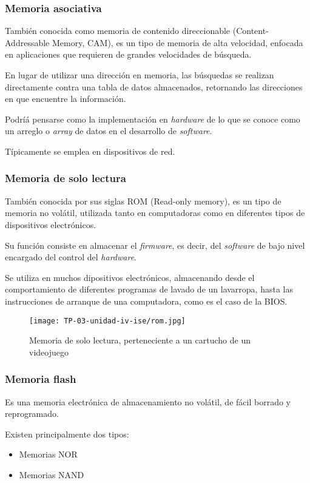 \documentclass[12pt]{article}
\begin{document}
\subsubsection{Memoria asociativa}

También conocida como memoria de contenido direccionable
(Content-Addressable Memory, CAM),
es un tipo de memoria de alta velocidad,
enfocada en aplicaciones que requieren de grandes velocidades de búsqueda.

En lugar de utilizar una dirección en memoria, las búsquedas
se realizan directamente contra una tabla de datos almacenados,
retornando las direcciones en que encuentre la información.

Podríá pensarse como la implementación en \textit{hardware}
de lo que se conoce como un arreglo o \textit{array} de datos en el
desarrollo de \textit{software}.

Típicamente se emplea en dispositivos de red.

\subsubsection{Memoria de solo lectura}

También conocida por sus siglas ROM
(Read-only memory),
es un tipo de memoria no volátil,
utilizada tanto en computadoras como en diferentes tipos de dispositivos
electrónicos.

Su función consiste en almacenar el \textit{firmware},
es decir, del \textit{software} de bajo nivel encargado del control del
\textit{hardware}.

Se utiliza en muchos dipositivos electrónicos,
almacenando desde el comportamiento de diferentes programas de lavado de un
lavarropa, hasta las instrucciones de arranque de una computadora,
como es el caso de la BIOS.

\begin{figure}[h]
  \centering
  \texttt{[image: TP-03-unidad-iv-ise/rom.jpg]}
  \caption{Memoria de solo lectura, perteneciente a un cartucho de un videojuego}
\end{figure}

\subsubsection{Memoria flash}

Es una memoria electrónica de almacenamiento no volátil,
de fácil borrado y reprogramado.

Existen principalmente dos tipos:
\begin{itemize}
  \item Memorias NOR
  \item Memorias NAND
\end{itemize}
\end{document}
